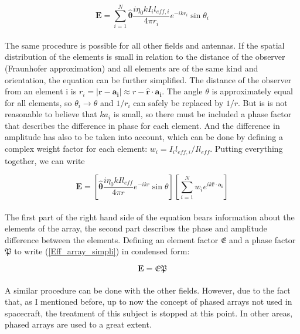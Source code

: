 \documentclass[a4paper,10pt]{thesis}
\begin{document}
\begin{equation}\label{Eff_array}
\mathbf{E} = \sum_{i=1}^N\mathbf{ \hat{\theta} }\frac{i \eta_0 k I_i l_{eff,i}}{4 \pi r_i} e^{-ikr_i } \sin \theta_i
\end{equation}

\paragraph*{}
The same procedure is possible for all other fields and antennas. If the spatial distribution of the elements is small in relation to the distance of the observer (Fraunhofer approximation) and all elements are of the same kind and orientation, the equation can be further simplified. The distance of the observer from an element i is $r_i=|\mathbf{r}-\mathbf{a_i}|\approx r-\mathbf{\hat{r}} \cdot \mathbf{a_i} $. The angle $\theta$ is approximately equal for all elements, so $\theta_i \rightarrow \theta$ and $1/r_i$ can safely be replaced by $1/r$. But is is not reasonable to believe that $ka_i$ is small, so there must be included a phase factor that describes the difference in phase for each element. And the difference in amplitude has also to be taken into account, which can be done by defining a complex weight factor for each element: $w_i=I_il_{eff,i}/Il_{eff}$. Putting everything together, we can write

\begin{equation}\label{Eff_array_simpli}
\mathbf{E} = \left[ \mathbf{\hat{\theta}} \frac{i \eta_0 k I l_{eff}}{4 \pi r} e^{-ikr } \sin \theta \right] \left[ \sum_{i=1}^N w_i e^{ik \mathbf{\hat{r}} \cdot \mathbf{a_i}} \right]
\end{equation}

\paragraph*{}
The first part of the right hand side of the equation bears information about the elements of the array, the second part describes the phase and amplitude difference between the elements. Defining an element factor $\mathfrak{E}$ and a phase factor $\mathfrak{P}$ to write (\ref{Eff_array_simpli}) in condensed form:

\begin{equation}\label{Eff_array_simpli_simpli}
\mathbf{E} = \mathfrak{E}\mathfrak{P}
\end{equation}

\paragraph*{}
A similar procedure can be done with the other fields. However, due to the fact that, as I mentioned before, up to now the concept of phased arrays not used in spacecraft, the treatment of this subject is stopped at this point. In other areas, phased arrays are used to a great extent.
\end{document}

